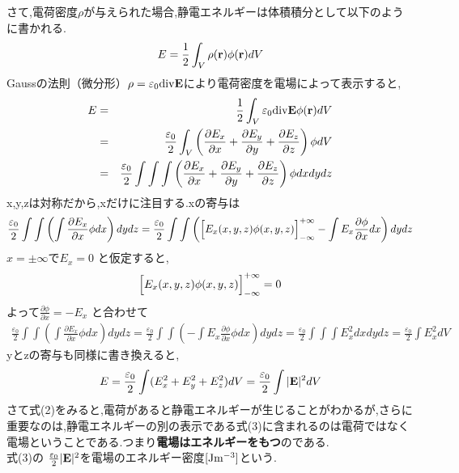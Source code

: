 \documentclass[../main]{subfiles}
\begin{document}
さて,電荷密度$\rho$が与えられた場合,静電エネルギーは体積積分として以下のように書かれる.
\begin{eqnarray*}
E = \frac{1}{2} \int_{V}^{} \rho({\bf r}) \phi({\bf r}) dV
\end{eqnarray*}
Gaussの法則（微分形）$\rho = \varepsilon_0 {\rm div}{\bf E}$により電荷密度を電場によって表示すると,
\begin{eqnarray*}
E &=& \frac{1}{2} \int_{V}^{} \varepsilon_0 {\rm div}{\bf E} \phi({\bf r}) dV \\
&=& \frac{\varepsilon_0}{2} \int_{V}^{} \left( \frac{\partial E_x}{\partial x} + \frac{\partial E_y}{\partial y} + \frac{\partial E_z}{\partial z} \right)\phi dV \\
&=& \frac{\varepsilon_0}{2} \int \int \int \left( \frac{\partial E_x}{\partial x} + \frac{\partial E_y}{\partial y} + \frac{\partial E_z}{\partial z} \right)\phi  dx dy dz
\end{eqnarray*}
x,y,zは対称だから,xだけに注目する.xの寄与は
\begin{equation*}
\frac{\varepsilon_0}{2} \int \int \left( \int \frac{\partial E_x}{\partial x}\phi dx \right) dy dz 
= \frac{\varepsilon_0}{2} \int \int \left( \Bigl[ E_x(x,y,z) \phi(x,y,z) \Bigr]_{-\infty}^{+\infty} - \int E_x \frac{\partial \phi}{\partial x} dx \right) dy dz
\end{equation*}
$x=\pm \infty$で$E_x=0$ と仮定すると,
\begin{eqnarray*}
\Bigl[ E_x(x,y,z) \phi(x,y,z) \Bigr]_{-\infty}^{+\infty} = 0
\end{eqnarray*}
よって$\frac{\partial \phi}{\partial x}=-E_x$ と合わせて
\begin{eqnarray*}
\frac{\varepsilon_0}{2} \int \int \left( \int \frac{\partial E_x}{\partial x}\phi dx \right) dy dz = \frac{\varepsilon_0}{2} \int \int \left( - \int E_x \frac{\partial \phi}{\partial x}\phi dx \right) dy dz = \frac{\varepsilon_0}{2} \int \int \int E_x^2 dx dy dz = \frac{\varepsilon_0}{2} \int E_x^2 dV
\end{eqnarray*}
yとzの寄与も同様に書き換えると,
\begin{eqnarray}
E = \frac{\varepsilon_0}{2} \int (E_x^2 + E_y^2 + E_z^2) dV = \frac{\varepsilon_0}{2} \int |{\bf E}|^2 dV
\end{eqnarray}
さて式(2)をみると,電荷があると静電エネルギーが生じることがわかるが,さらに重要なのは,静電エネルギーの別の表示である式(3)に含まれるのは電荷ではなく電場ということである.つまり{\bf 電場はエネルギーをもつ}のである. \\
式(3)の $\frac{\varepsilon_0}{2}|{\bf E}|^2$を電場のエネルギー密度$[{\rm Jm^{-3}}]$という. \\
\end{document}
